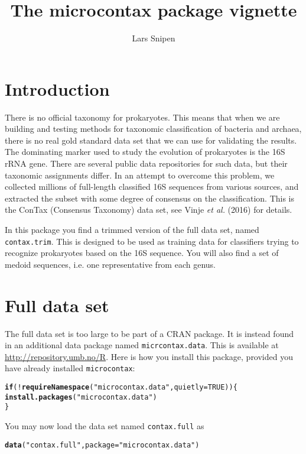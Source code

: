 \documentclass[a4paper]{article}\usepackage[]{graphicx}\usepackage[]{color}
\title{The microcontax package vignette}
\author{Lars Snipen}
\date{}
\makeatletter
\newcommand{\hlnum}[1]{\textcolor[rgb]{0.686,0.059,0.569}{#1}}%
\newcommand{\hlstr}[1]{\textcolor[rgb]{0.192,0.494,0.8}{#1}}%
\newcommand{\hlopt}[1]{\textcolor[rgb]{0,0,0}{#1}}%
\newcommand{\hlstd}[1]{\textcolor[rgb]{0.345,0.345,0.345}{#1}}%
\newcommand{\hlkwa}[1]{\textcolor[rgb]{0.161,0.373,0.58}{\textbf{#1}}}%
\newcommand{\hlkwc}[1]{\textcolor[rgb]{0.333,0.667,0.333}{#1}}%
\newcommand{\hlkwd}[1]{\textcolor[rgb]{0.737,0.353,0.396}{\textbf{#1}}}%
\newenvironment{kframe}{%
 \def\at@end@of@kframe{}%
 \ifinner\ifhmode%
  \def\at@end@of@kframe{\end{minipage}}%
  \begin{minipage}{\columnwidth}%
 \fi\fi%
 \def\FrameCommand##1{\hskip\@totalleftmargin \hskip-\fboxsep
 \colorbox{shadecolor}{##1}\hskip-\fboxsep
     \hskip-\linewidth \hskip-\@totalleftmargin \hskip\columnwidth}%
 \MakeFramed {\advance\hsize-\width
   \@totalleftmargin\z@ \linewidth\hsize
   \@setminipage}}%
 {\par\unskip\endMakeFramed%
 \at@end@of@kframe}
\newenvironment{knitrout}{}{} %
\makeatother
\begin{document}

\maketitle


\section{Introduction}
There is no official taxonomy for prokaryotes. This means that when we are building and testing methods for taxonomic classification of bacteria and archaea, there is no real gold standard data set that we can use for validating the results. The dominating marker used to study the evolution of prokaryotes is the 16S rRNA gene. There are several public data repositories for such data, but their taxonomic assignments differ. In an attempt to overcome this problem, we collected millions of full-length classified 16S sequences from various sources, and extracted the subset with some degree of consensus on the classification. This is the ConTax (Consensus Taxonomy) data set, see Vinje \emph{et al.} (2016) for details.

In this package you find a trimmed version of the full data set, named \texttt{contax.trim}. This is designed to be used as training data for classifiers trying to recognize prokaryotes based on the 16S sequence. You will also find a set of medoid sequences, i.e. one representative from each genus.


\section{Full data set}
The full data set is too large to be part of a CRAN package. It is instead found in an additional data package named \texttt{micrcontax.data}. This is available at \url{http://repository.umb.no/R}. Here is how you install this package, provided you have already installed \texttt{microcontax}:
\begin{knitrout}
\color{fgcolor}\begin{kframe}
\begin{alltt}
\hlkwa{if} \hlstd{(}\hlopt{!}\hlkwd{requireNamespace}\hlstd{(}\hlstr{"microcontax.data"}\hlstd{,} \hlkwc{quietly} \hlstd{=} \hlnum{TRUE}\hlstd{)) \{}
 \hlkwd{install.packages}\hlstd{(}\hlstr{"microcontax.data"}\hlstd{)}
\hlstd{\}}
\end{alltt}
\end{kframe}
\end{knitrout}
You may now load the data set named \texttt{contax.full} as
\begin{knitrout}
\color{fgcolor}\begin{kframe}
\begin{alltt}
\hlkwd{data}\hlstd{(}\hlstr{"contax.full"}\hlstd{,} \hlkwc{package}\hlstd{=}\hlstr{"microcontax.data"}\hlstd{)}
\end{alltt}
\end{kframe}
\end{knitrout}
\end{document}
